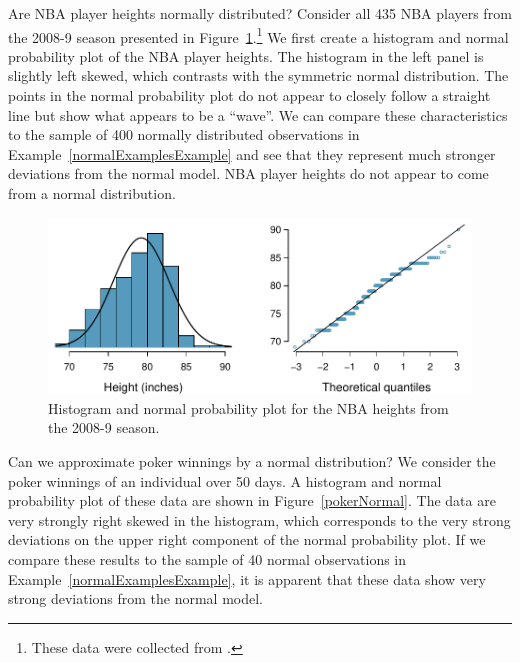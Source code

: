 \begin{example}{Are NBA player heights normally distributed? Consider all 435 NBA players from the 2008-9 season presented in Figure~\ref{nbaNormal}.\footnote{These data were collected from .}}
We first create a histogram and normal probability plot of the NBA player heights. The histogram in the left panel is slightly left skewed, which contrasts with the symmetric normal distribution. The points in the normal probability plot do not appear to closely follow a straight line but show what appears to be a ``wave''. We can compare these characteristics to the sample of 400 normally distributed observations in Example~\ref{normalExamplesExample} and see that they represent much stronger deviations from the normal model. NBA player heights do not appear to come from a normal distribution.
\end{example}

\begin{figure}
\centering
\includegraphics[width=\textwidth]{02/figures/nbaNormal/nbaNormal}
\caption{Histogram and normal probability plot for the NBA heights from the 2008-9 season.}
\label{nbaNormal}
\end{figure}

\begin{example}{Can we approximate poker winnings by a normal distribution? We consider the poker winnings of an individual over 50 days. A histogram and normal probability plot of these data are shown in Figure~\ref{pokerNormal}.}
The data are very strongly right skewed in the histogram, which corresponds to the very strong deviations on the upper right component of the normal probability plot. If we compare these results to the sample of 40 normal observations in Example~\ref{normalExamplesExample}, it is apparent that these data show very strong deviations from the normal model.
\end{example}

